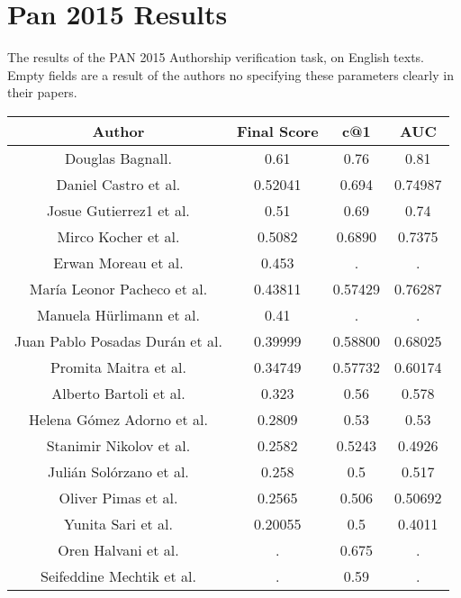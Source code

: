 \section{Pan 2015 Results} \label{sec:appendix:pan_2015_results}
The results of the PAN 2015 Authorship verification task, on English texts.
Empty fields are a result of the authors no specifying these parameters clearly
in their papers.

\begin{center}
\begin{tabular}{|c|c|c|c|}
\hline
\textbf{Author}                 & \textbf{Final Score} & \textbf{c@1} & \textbf{AUC} \\ \hline
Douglas Bagnall.                & 0.61                 & 0.76         & 0.81         \\ \hline
Daniel Castro et al.            & 0.52041              & 0.694        & 0.74987      \\ \hline
Josue Gutierrez1 et al.         & 0.51                 & 0.69         & 0.74         \\ \hline
Mirco Kocher et al.             & 0.5082               & 0.6890       & 0.7375       \\ \hline
Erwan Moreau et al.             & 0.453                & .            & .            \\ \hline
María Leonor Pacheco et al.     & 0.43811              & 0.57429      & 0.76287      \\ \hline
Manuela Hürlimann et al.        & 0.41                 & .            & .            \\ \hline
Juan Pablo Posadas Durán et al. & 0.39999              & 0.58800      & 0.68025      \\ \hline
Promita Maitra et al.           & 0.34749              & 0.57732      & 0.60174      \\ \hline
Alberto Bartoli et al.          & 0.323                & 0.56         & 0.578        \\ \hline
Helena Gómez Adorno et al.      & 0.2809               & 0.53         & 0.53         \\ \hline
Stanimir Nikolov et al.         & 0.2582               & 0.5243       & 0.4926       \\ \hline
Julián Solórzano et al.         & 0.258                & 0.5          & 0.517        \\ \hline
Oliver Pimas et al.             & 0.2565               & 0.506        & 0.50692      \\ \hline
Yunita Sari et al.              & 0.20055              & 0.5          & 0.4011       \\ \hline
Oren Halvani et al.             & .                    & 0.675        & .            \\ \hline
Seifeddine Mechtik et al.       & .                    & 0.59         & .            \\ \hline
\end{tabular}
\end{center}
